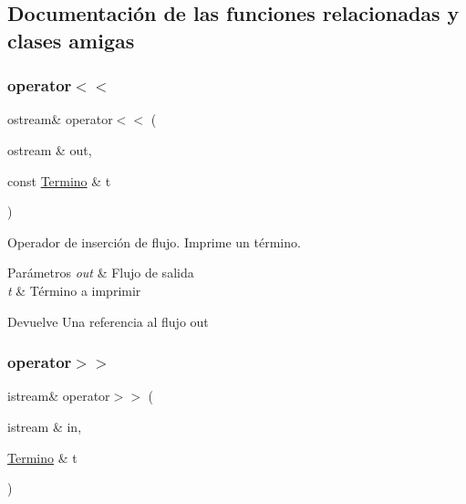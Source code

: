 \subsection{Documentación de las funciones relacionadas y clases amigas}
\mbox{\label{classTermino_a3f023e4474dc0034666373694cfc08b8}} 
\subsubsection{\texorpdfstring{operator$<$$<$}{operator<<}}
{\footnotesize\ttfamily ostream\& operator$<$$<$ (\begin{DoxyParamCaption}\item[{ostream \&}]{out,  }\item[{const \hyperlink{classTermino}{Termino} \&}]{t }\end{DoxyParamCaption})\hspace{0.3cm}{\ttfamily [friend]}}



Operador de inserción de flujo. Imprime un término. 


\begin{DoxyParams}{Parámetros}
{\em out} & Flujo de salida \\
\hline
{\em t} & Término a imprimir \\
\hline
\end{DoxyParams}
\begin{DoxyReturn}{Devuelve}
Una referencia al flujo out 
\end{DoxyReturn}
\mbox{\label{classTermino_a42f635c3609287dbbf2bd65d035fa7f8}} 
\subsubsection{\texorpdfstring{operator$>$$>$}{operator>>}}
{\footnotesize\ttfamily istream\& operator$>$$>$ (\begin{DoxyParamCaption}\item[{istream \&}]{in,  }\item[{\hyperlink{classTermino}{Termino} \&}]{t }\end{DoxyParamCaption})\hspace{0.3cm}{\ttfamily [friend]}}



